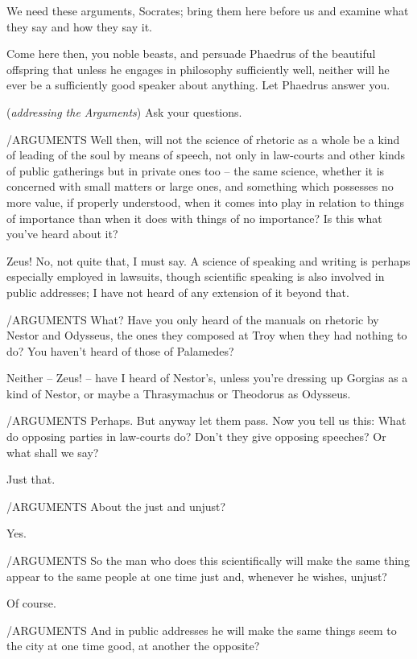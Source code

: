 We need these arguments, Socrates; bring them  here
before us and examine what they say and how they say it.

Come here then, you noble beasts, and persuade Phaedrus of the
beautiful offspring that
unless he engages in philosophy sufficiently well, neither will he ever
be a sufficiently  good speaker about anything. Let Phaedrus
answer you.

({\em addressing the Arguments}) Ask your questions.

/ARGUMENTS Well then, will not the science of rhetoric as a
whole be a kind of leading of the soul by means of
speech, not only in
law-courts and other kinds of public gatherings but in private ones too
-- the same science, whether  it is concerned with small matters
or large ones, and something which possesses no more value, if properly
understood, when it comes into play in relation to things of importance
than when it does with things of no importance? Is this what you've
heard about it?

Zeus! No, not quite that, I must say. A science of 
speaking and writing is perhaps especially employed in lawsuits, though
scientific speaking is also involved in public addresses; I have not
heard of any extension of it beyond that.

/ARGUMENTS What? Have you only heard of the manuals on rhetoric
by Nestor and Odysseus, the ones they composed at Troy when they had
nothing to do? You haven't heard of those of
Palamedes?

 Neither -- Zeus! -- have I heard of Nestor's, unless
you're dressing up Gorgias as a kind of Nestor, or maybe a Thrasymachus
or Theodorus as
Odysseus.

/ARGUMENTS Perhaps. But anyway let them pass.  Now you
tell us this: What do opposing parties in law-courts do? Don't they give
opposing speeches? Or what shall we say?

Just that.

/ARGUMENTS About the just and unjust?

Yes.

 /ARGUMENTS So the man who does this scientifically
 will make the same thing appear to the same people at one time
just and, whenever he wishes, unjust?

Of course.

/ARGUMENTS And in public addresses he will make the same things
seem to the city at one time good, at another the
opposite?

